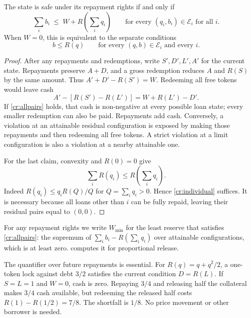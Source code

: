 \begin{theorem}\label{cr:kernel}
The state is safe under its repayment rights if and only if
\begin{equation}\label{cr:allpairs}
\sum_i b_i\;\le\;W+R\!\left(\sum_i q_i\right)
\qquad\text{for every }(q_i,b_i)\in\mathcal E_i\text{ for all }i.
\end{equation}
When $W=0$, this is equivalent to the separate conditions
\begin{equation}\label{cr:individual}
b\le R(q)\qquad\text{for every }(q,b)\in\mathcal E_i\text{ and every }i.
\end{equation}
\end{theorem}
\begin{proof}
After any repayments and redemptions, write $S',D',L',A'$ for the current state. Repayments preserve $A+D$, and a gross redemption reduces $A$ and $R(S)$ by the same amount. Thus $A'+D'-R(S')=W$. Redeeming all free tokens would leave cash
\[
A'-[R(S')-R(L')]=W+R(L')-D'.
\]
If \eqref{cr:allpairs} holds, that cash is non-negative at every possible loan state; every smaller redemption can also be paid. Repayments add cash. Conversely, a violation at an attainable residual configuration is exposed by making those repayments and then redeeming all free tokens. A strict violation at a limit configuration is also a violation at a nearby attainable one.

For the last claim, convexity and $R(0)=0$ give
\begin{equation}\label{cr:superadd}
\sum_i R(q_i)\le R\!\left(\sum_iq_i\right).
\end{equation}
Indeed $R(q_i)\le q_i R(Q)/Q$ for $Q=\sum_iq_i>0$. Hence \eqref{cr:individual} suffices. It is necessary because all loans other than $i$ can be fully repaid, leaving their residual pairs equal to $(0,0)$.
\end{proof}

For any repayment rights we write $W_{\min}$ for the least reserve that satisfies \eqref{cr:allpairs}: the supremum of $\sum_ib_i-R(\sum_iq_i)$ over attainable configurations, which is at least zero.  computes it for proportional release.

The quantifier over future repayments is essential. For $R(q)=q+q^2/2$, a one-token lock against debt $3/2$ satisfies the current condition $D=R(L)$. If $S=L=1$ and $W=0$, cash is zero. Repaying $3/4$ and releasing half the collateral makes $3/4$ cash available, but redeeming the released half costs $R(1)-R(1/2)=7/8$. The shortfall is $1/8$. No price movement or other borrower is needed.

